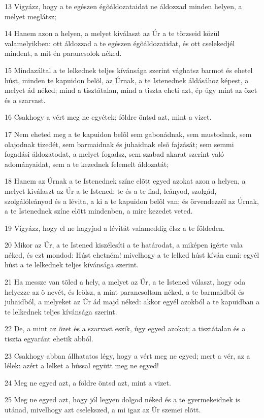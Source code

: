 \par 13 Vigyázz, hogy a te egészen égõáldozataidat ne áldozzad minden helyen, a melyet meglátsz;
\par 14 Hanem azon a helyen, a melyet kiválaszt az Úr a te törzseid közül valamelyikben: ott áldozzad a te egészen égõáldozatidat, és ott cselekedjél mindent, a mit én parancsolok néked.
\par 15 Mindazáltal a te lelkednek teljes kívánsága szerint vághatsz barmot és ehetel húst, minden te kapuidon belõl, az Úrnak, a te Istenednek áldásához képest, a melyet ád néked; mind a tisztátalan, mind a tiszta eheti azt, ép úgy mint az õzet és a szarvast.
\par 16 Csakhogy a vért meg ne egyétek; földre öntsd azt, mint a vizet.
\par 17 Nem eheted meg a te kapuidon belõl sem gabonádnak, sem mustodnak, sem olajodnak tizedét, sem barmaidnak és juhaidnak elsõ fajzását; sem semmi fogadási áldozatodat, a melyet fogadsz, sem szabad akarat szerint való adományaidat, sem a te kezednek felemelt áldozatát;
\par 18 Hanem az Úrnak a te Istenednek színe elõtt egyed azokat azon a helyen, a melyet kiválaszt az Úr a te Istened: te és a te fiad, leányod, szolgád, szolgálóleányod és a lévita, a ki a te kapuidon belõl van; és örvendezzél az Úrnak, a te Istenednek színe elõtt mindenben, a mire kezedet veted.
\par 19 Vigyázz, hogy el ne hagyjad a lévitát valameddig élsz a te földeden.
\par 20 Mikor az Úr, a te Istened kiszélesíti a te határodat, a miképen igérte vala néked, és ezt mondod: Húst ehetném! mivelhogy a te lelked húst kíván enni: egyél húst a te lelkednek teljes kívánsága szerint.
\par 21 Ha messze van tõled a hely, a melyet az Úr, a te Istened választ, hogy oda helyezze az õ nevét, és leölsz, a mint parancsoltam néked, a te barmaidból és juhaidból, a melyeket az Úr ád majd néked: akkor egyél azokból a te kapuidban a te lelkednek teljes kívánsága szerint.
\par 22 De, a mint az õzet és a szarvast eszik, úgy egyed azokat; a tisztátalan és a tiszta egyaránt ehetik abból.
\par 23 Csakhogy abban állhatatos légy, hogy a vért meg ne egyed; mert a vér, az a lélek: azért a lelket a hússal együtt meg ne egyed!
\par 24 Meg ne egyed azt, a földre öntsd azt, mint a vizet.
\par 25 Meg ne egyed azt, hogy jól legyen dolgod néked és a te gyermekeidnek is utánad, mivelhogy azt cselekszed, a mi igaz az Úr szemei elõtt.

